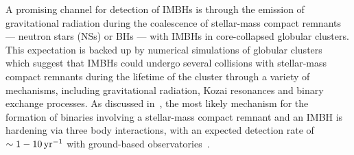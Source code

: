 A promising channel for detection of IMBHs is through the emission of gravitational radiation during the coalescence of stellar-mass compact remnants --- neutron stars (NSs) or BHs --- with IMBHs in core-collapsed globular clusters. This expectation is backed up by numerical simulations of globular clusters~\cite{Taniguchi:2000,Miller:2002,Mouri:2002a,Mouri:2002b,Gultekin:2004,Gultekin:2006,Oleary:2006,Oleary:2007}  which suggest that IMBHs could undergo several collisions with stellar-mass compact remnants during the lifetime of the cluster through a variety of mechanisms, including gravitational radiation, Kozai resonances and binary exchange processes.  As discussed in~\cite{man}, the most likely mechanism for the formation of binaries involving a stellar-mass compact remnant and an IMBH is hardening via three body interactions, with an expected detection rate of \(\sim 1-10\, {\rm{yr}}^{-1}\) with ground-based observatories~\cite{man,Abadie:2010}. 


